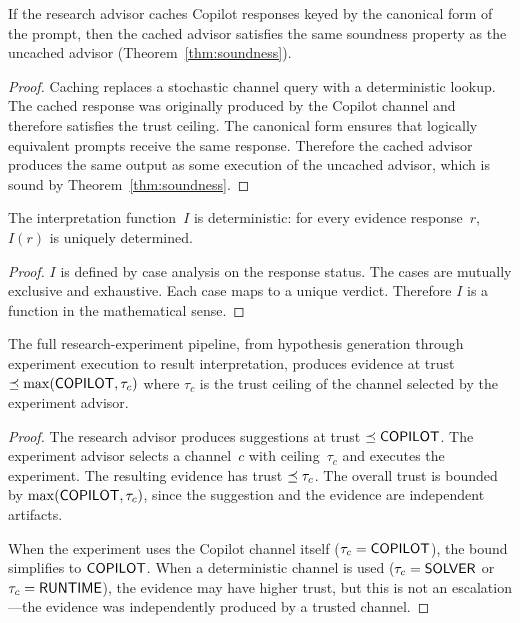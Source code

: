 \documentclass[11pt]{article}
\begin{document}
\begin{lemma}%
\label{lem:cachesound}
If the research advisor caches Copilot responses keyed
by the canonical form of the prompt, then the cached
advisor satisfies the same soundness property as the
uncached advisor (Theorem~\ref{thm:soundness}).
\end{lemma}
\begin{proof}
Caching replaces a stochastic channel query with a
deterministic lookup.  The cached response was originally
produced by the Copilot channel and therefore satisfies
the trust ceiling.  The canonical form ensures that
logically equivalent prompts receive the same response.
Therefore the cached advisor produces the same output
as some execution of the uncached advisor, which is
sound by Theorem~\ref{thm:soundness}.
\end{proof}

\begin{lemma}%
\label{lem:interpdet}
The interpretation function~$I$ is deterministic:
for every evidence response~$r$, $I(r)$ is uniquely
determined.
\end{lemma}
\begin{proof}
$I$ is defined by case analysis on the response status.
The cases are mutually exclusive and exhaustive.  Each
case maps to a unique verdict.  Therefore $I$ is a
function in the mathematical sense.
\end{proof}

\begin{proposition}%
\label{prop:fullpipe}
The full research-experiment pipeline, from hypothesis
generation through experiment execution to result
interpretation, produces evidence at trust $\preceq
\max(\mathsf{COPILOT}, \tau_c)$ where $\tau_c$ is the trust
ceiling of the channel selected by the experiment advisor.
\end{proposition}
\begin{proof}
The research advisor produces suggestions at trust
$\preceq \mathsf{COPILOT}$.  The experiment advisor selects a
channel~$c$ with ceiling~$\tau_c$ and executes the
experiment.  The resulting evidence has trust
$\preceq \tau_c$.  The overall trust is bounded by
$\max(\mathsf{COPILOT}, \tau_c)$, since the suggestion and
the evidence are independent artifacts.

When the experiment uses the Copilot channel itself
($\tau_c = \mathsf{COPILOT}$), the bound simplifies to
$\mathsf{COPILOT}$.  When a deterministic channel is used
($\tau_c = \mathsf{SOLVER}$ or $\tau_c = \mathsf{RUNTIME}$), the
evidence may have higher trust, but this is not an
escalation---the evidence was independently produced
by a trusted channel.
\end{proof}
\end{document}
